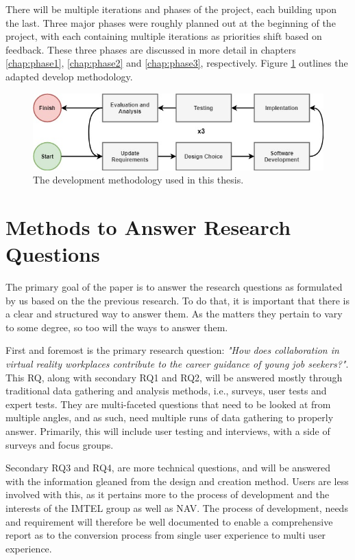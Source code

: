 There will be multiple iterations and phases of the project, each building upon the last. Three major phases were roughly planned out at the beginning of the project, with each containing multiple iterations as priorities shift based on feedback. These three phases are discussed in more detail in chapters \ref{chap:phase1}, \ref{chap:phase2} and \ref{chap:phase3}, respectively. Figure \ref{fig:devMethod} outlines the adapted develop methodology.

\begin{figure}[H]
     \centering
     \includegraphics[width=.9\textwidth]{fig/researchMethodology/devMethod.jpg}
     \captionsetup{width=0.9\linewidth}
     \caption{The development methodology used in this thesis.}
     \label{fig:devMethod}
 \end{figure}



\section{Methods to Answer Research Questions}
The primary goal of the paper is to answer the research questions as formulated by us based on the the previous research. To do that, it is important that there is a clear and structured way to answer them. As the matters they pertain to vary to some degree, so too will the ways to answer them. 

First and foremost is the primary research question: \textit{"How does collaboration in virtual reality workplaces contribute to the career guidance of young job seekers?"}.  This RQ, along with secondary RQ1 and RQ2, will be answered mostly through traditional data gathering and analysis methods, i.e., surveys, user tests and expert tests. They are multi-faceted questions that need to be looked at from multiple angles, and as such, need multiple runs of data gathering to properly answer. Primarily, this will include user testing and interviews, with a side of surveys and focus groups.

Secondary RQ3 and RQ4, are more technical questions, and will be answered with the information gleaned from the design and creation method. Users are less involved with this, as it pertains more to the process of development and the interests of the IMTEL group as well as NAV. The process of development, needs and requirement will therefore be well documented to enable a comprehensive report as to the conversion process from single user experience to multi user experience. 




